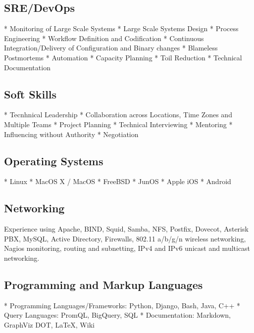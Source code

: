 \documentclass[a4paper, 11pt] {article}
\begin{document}
\subsection*{SRE/DevOps}

* Monitoring of Large Scale Systems
* Large Scale Systems Design
* Process Engineering
* Workflow Definition and Codification
* Continuous Integration/Delivery of Configuration and Binary changes
* Blameless Postmortems
* Automation
* Capacity Planning
* Toil Reduction
* Technical Documentation

\subsection*{Soft Skills}

* Tecnhnical Leadership
* Collaboration across Locations, Time Zones and Multiple Teams
* Project Planning
* Technical Interviewing
* Mentoring
* Influencing without Authority
* Negotiation

\subsection*{Operating Systems}

* Linux
* MacOS X / MacOS
* FreeBSD
* JunOS
* Apple iOS
* Android

\subsection*{Networking}


Experience using Apache, BIND, Squid, Samba, NFS, Postfix, Dovecot,
Asterisk PBX, MySQL, Active  Directory, Firewalls, 802.11 a/b/g/n wireless 
networking, Nagios monitoring, routing and subnetting, IPv4 and IPv6 
unicast and multicast networking.

\subsection*{Programming and Markup Languages}

* Programming Languages/Frameworks: Python, Django, Bash, Java, C++
* Query Languages: PromQL, BigQuery, SQL
* Documentation: Markdown, GraphViz DOT, LaTeX, Wiki
\end{document}
